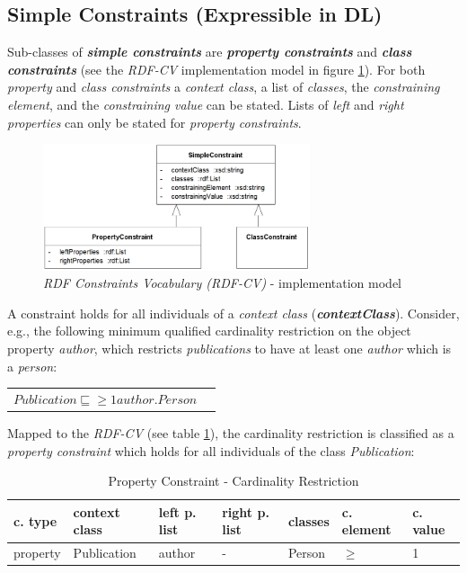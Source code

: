 \documentclass{llncs}
\newenvironment{DL}{
  \vspace{0cm}
	\begin{center}
  \begin{tabular}{r l}

}{
  \end{tabular}
	\end{center}
}
\begin{document}
\subsection{Simple Constraints (Expressible in DL)}

Sub-classes of \textbf{\emph{simple constraints}} are \textbf{\emph{property constraints}} and \textbf{\emph{class constraints}} (see the \emph{RDF-CV} implementation model in figure \ref{fig:RDF-CV-implementation-model}). 
For both \emph{property} and \emph{class constraints} a \emph{context class}, a list of \emph{classes}, the \emph{constraining element}, and the \emph{constraining value} can be stated. 
Lists of \emph{left} and \emph{right properties} can only be stated for \emph{property constraints}.

\begin{figure}
	\centering
		\includegraphics[width=0.70\textwidth]{images/RDF-CV-implementation-model.png}
	\caption{\emph{RDF Constraints Vocabulary (RDF-CV)} - implementation model}
	\label{fig:RDF-CV-implementation-model}
\end{figure}

A constraint holds for all individuals of a \emph{context class} (\textbf{\emph{contextClass}}).
Consider, e.g., the following minimum qualified cardinality restriction on the object property \emph{author}, which restricts \emph{publications} to have at least one \emph{author} which is a \emph{person}: 
\begin{DL}
$Publication \sqsubseteq \geq1 author . Person $
\end{DL}
Mapped to the \emph{RDF-CV} (see table \ref{tab:property-constraint-cardinality-restriction}), the cardinality restriction is classified as a \emph{property constraint} which holds for all individuals of the class \emph{Publication}:

\begin{table}
  \scriptsize
  \sffamily
  \vspace{0cm}
	\centering
		\begin{tabular}{l|l|l|l|l|l|l}
      \textbf{c. type} & \textbf{context class} & \textbf{left p. list} & \textbf{right p. list} & \textbf{classes} & \textbf{c. element} & \textbf{c. value} \\
      \hline
      property & Publication & author & - & Person & $\geq$ & 1 \\
		\end{tabular}
	\caption{Property Constraint - Cardinality Restriction}
	\label{tab:property-constraint-cardinality-restriction}
\end{table}
\end{document}
